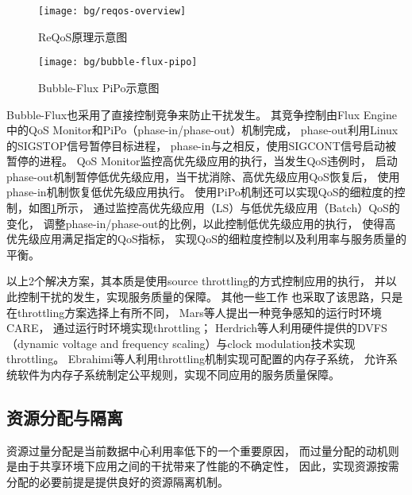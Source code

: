 \begin{figure}[tb]
\begin{minipage}[b]{0.42\textwidth}
  \centering
  \texttt{[image: bg/reqos-overview]}
  \caption[ReQoS原理示意图]{ReQoS原理示意图\cite{tang_reqos:_2013}}
  \label{fig:reqos-overview}
\end{minipage}\hfill
\begin{minipage}[b]{0.55\textwidth}
  \centering
  \texttt{[image: bg/bubble-flux-pipo]}
  \caption[Bubble-Flux PiPo示意图]{Bubble-Flux PiPo示意图\cite{yang_bubble-flux:_2013}}
  \label{fig:bubble-flux-pipo}
\end{minipage}
\end{figure}

Bubble-Flux\cite{yang_bubble-flux:_2013}也采用了直接控制竞争来防止干扰发生。
其竞争控制由Flux Engine中的QoS Monitor和PiPo（phase-in/phase-out）机制完成，
phase-out利用Linux的SIGSTOP信号暂停目标进程，
phase-in与之相反，使用SIGCONT信号启动被暂停的进程。
QoS Monitor监控高优先级应用的执行，当发生QoS违例时，
启动phase-out机制暂停低优先级应用，当干扰消除、高优先级应用QoS恢复后，
使用phase-in机制恢复低优先级应用执行。
使用PiPo机制还可以实现QoS的细粒度的控制，如图\ref{fig:bubble-flux-pipo}所示，
通过监控高优先级应用（LS）与低优先级应用（Batch）QoS的变化，
调整phase-in/phase-out的比例，以此控制低优先级应用的执行，
使得高优先级应用满足指定的QoS指标，
实现QoS的细粒度控制以及利用率与服务质量的平衡。

以上2个解决方案，其本质是使用source throttling的方式控制应用的执行，
并以此控制干扰的发生，实现服务质量的保障。
其他一些工作\cite{mars_contention_2010, herdrich_rate-based_2009, ebrahimi:2010}
也采取了该思路，只是在throttling方案选择上有所不同，
Mars等人\cite{mars_contention_2010}提出一种竞争感知的运行时环境CARE，
通过运行时环境实现throttling；
Herdrich等人\cite{herdrich_rate-based_2009}利用硬件提供的DVFS
（dynamic voltage and frequency scaling）与clock modulation技术实现throttling。
Ebrahimi等人\cite{ebrahimi:2010}利用throttling机制实现可配置的内存子系统，
允许系统软件为内存子系统制定公平规则，实现不同应用的服务质量保障。


\subsection{资源分配与隔离}

资源过量分配是当前数据中心利用率低下的一个重要原因，
而过量分配的动机则是由于共享环境下应用之间的干扰带来了性能的不确定性，
因此，实现资源按需分配的必要前提是提供良好的资源隔离机制。

